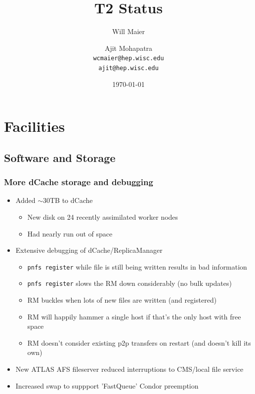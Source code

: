 \documentclass{beamer}
\title{T2 Status}
\author[Maier, Mohapatra]{
    Will Maier \and Ajit Mohapatra\\ 
    {\tt wcmaier@hep.wisc.edu}\\
    {\tt ajit@hep.wisc.edu}}
\institute[Wisconsin]{University of Wisconsin - High Energy Physics}
\date{\today}
\newcommand{\ca}{\ensuremath{\sim}}
\begin{document}
\begin{frame}
    \titlepage
\end{frame}



\section{Facilities}
\subsection{Software and Storage}
\begin{frame}
\frametitle{More dCache storage and debugging}
\begin{itemize}
    \item Added \ca{}30TB to dCache
    \begin{itemize}
        \item New disk on 24 recently assimilated worker nodes
        \item Had nearly run out of space
    \end{itemize}
    \item Extensive debugging of dCache/ReplicaManager
    \begin{itemize}
        \item {\tt pnfs register} while file is still being written results in bad information
        \item {\tt pnfs register} slows the RM down considerably (no bulk updates)
        \item RM buckles when lots of new files are written (and registered)
        \item RM will happily hammer a single host if that's the only host with free space
        \item RM doesn't consider existing p2p transfers on restart (and doesn't kill its own)
    \end{itemize}
    \item New ATLAS AFS fileserver reduced interruptions to CMS/local file service
    \item Increased swap to suppport 'FastQueue' Condor preemption
\end{itemize}
\end{frame}
\end{document}
